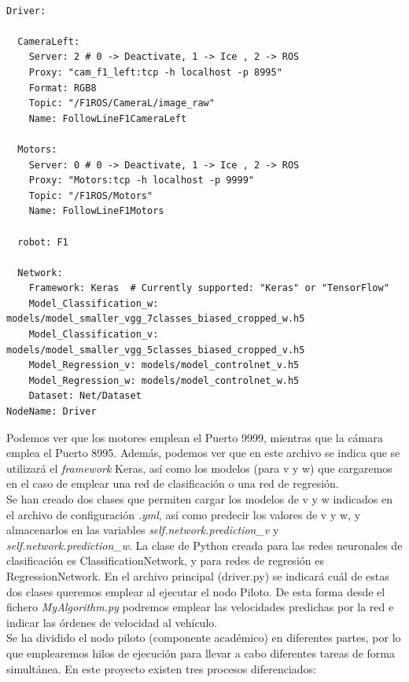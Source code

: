 \vspace{10pt}
\begin{lstlisting}

Driver:

  CameraLeft:
    Server: 2 # 0 -> Deactivate, 1 -> Ice , 2 -> ROS
    Proxy: "cam_f1_left:tcp -h localhost -p 8995"
    Format: RGB8
    Topic: "/F1ROS/CameraL/image_raw"
    Name: FollowLineF1CameraLeft

  Motors:
    Server: 0 # 0 -> Deactivate, 1 -> Ice , 2 -> ROS
    Proxy: "Motors:tcp -h localhost -p 9999"
    Topic: "/F1ROS/Motors"
    Name: FollowLineF1Motors

  robot: F1

  Network:
    Framework: Keras  # Currently supported: "Keras" or "TensorFlow"
    Model_Classification_w: models/model_smaller_vgg_7classes_biased_cropped_w.h5
    Model_Classification_v: models/model_smaller_vgg_5classes_biased_cropped_v.h5
    Model_Regression_v: models/model_controlnet_v.h5
    Model_Regression_w: models/model_controlnet_w.h5
    Dataset: Net/Dataset
NodeName: Driver
\end{lstlisting}
\vspace{20pt}

Podemos ver que los motores emplean el Puerto 9999, mientras que la cámara emplea el Puerto 8995. Además, podemos ver que en este archivo se indica que se utilizará el \textit{framework} Keras, así como los modelos (para v y w) que cargaremos en el caso de emplear una red de clasificación o una red de regresión.\\

Se han creado dos clases que permiten cargar los modelos de v y w indicados en el archivo de configuración \textit{.yml}, así como predecir los valores de v y w, y almacenarlos en las variables \textit{self.network.prediction\_v} y \textit{self.network.prediction\_w}. La clase de Python creada para las redes neuronales de clasificación es ClassificationNetwork, y para redes de regresión es RegressionNetwork. En el archivo principal (driver.py) se indicará cuál de estas dos clases queremos emplear al ejecutar el nodo Piloto. De esta forma desde el fichero \textit{MyAlgorithm.py} podremos emplear las velocidades predichas por la red e indicar las órdenes de velocidad al vehículo.\\

Se ha dividido el nodo piloto (componente académico) en diferentes partes, por lo que emplearemos hilos de ejecución para llevar a cabo diferentes tareas de forma simultánea. En este proyecto existen tres procesos diferenciados:

